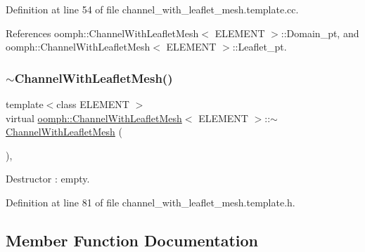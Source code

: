 Definition at line 54 of file channel\+\_\+with\+\_\+leaflet\+\_\+mesh.\+template.\+cc.



References oomph\+::\+Channel\+With\+Leaflet\+Mesh$<$ E\+L\+E\+M\+E\+N\+T $>$\+::\+Domain\+\_\+pt, and oomph\+::\+Channel\+With\+Leaflet\+Mesh$<$ E\+L\+E\+M\+E\+N\+T $>$\+::\+Leaflet\+\_\+pt.

\mbox{\label{classoomph_1_1ChannelWithLeafletMesh_ad767dc06cf65becc207f780f8100657c}} 
\subsubsection{\texorpdfstring{$\sim$\+Channel\+With\+Leaflet\+Mesh()}{~ChannelWithLeafletMesh()}}
{\footnotesize\ttfamily template$<$class E\+L\+E\+M\+E\+NT $>$ \\
virtual \hyperlink{classoomph_1_1ChannelWithLeafletMesh}{oomph\+::\+Channel\+With\+Leaflet\+Mesh}$<$ E\+L\+E\+M\+E\+NT $>$\+::$\sim$\hyperlink{classoomph_1_1ChannelWithLeafletMesh}{Channel\+With\+Leaflet\+Mesh} (\begin{DoxyParamCaption}{ }\end{DoxyParamCaption})\hspace{0.3cm}{\ttfamily [inline]}, {\ttfamily [virtual]}}



Destructor \+: empty. 



Definition at line 81 of file channel\+\_\+with\+\_\+leaflet\+\_\+mesh.\+template.\+h.



\subsection{Member Function Documentation}
\mbox{\label{classoomph_1_1ChannelWithLeafletMesh_a775c95ffa8fb9b7b512fc767528eab22}} 
